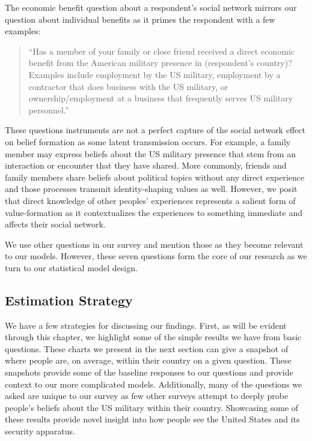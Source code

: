 The economic benefit question about a respondent's social network mirrors our question about individual benefits as it primes the respondent with a few examples:

	
	\begin{quote}
		``Has a member of your family or close friend received a direct economic benefit from the American military presence in (respondent's country)? Examples include employment by the US military, employment by a contractor that does business with the US military, or ownership/employment at a business that frequently serves US military personnel.''
	\end{quote}

These questions instruments are not a perfect capture of the social network effect on belief formation as some latent transmission occurs. For example, a family member may express beliefs about the US military presence that stem from an interaction or encounter that they have shared. More commonly, friends and family members share beliefs about political topics without any direct experience and those processes transmit identity-shaping values as well. However, we posit that direct knowledge of other peoples' experiences represents a salient form of value-formation as it contextualizes the experiences to something immediate and affects their social network. 

We use other questions in our survey and mention those as they become relevant to our models. However, these seven questions form the core of our research as we turn to our statistical model design.


\subsection*{Estimation Strategy}

We have a few strategies for discussing our findings. First, as will be evident through this chapter, we highlight some of the simple results we have from basic questions. These charts we present in the next section can give a snapshot of where people are, on average, within their country on a given question. These snapshots provide some of the baseline responses to our questions and provide context to our more complicated models. Additionally, many of the questions we asked are unique to our survey as few other surveys attempt to deeply probe people's beliefs about the US military within their country. Showcasing some of these results provide novel insight into how people see the United States and its security apparatus. 

